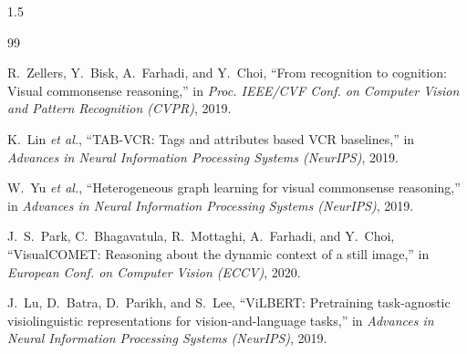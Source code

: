 \documentclass[a4paper, 14pt, oneside]{Thesis}
\begin{document}
{\pagestyle{plain}  %


\tableofcontents %


\listoftables

\listoffigures  %


\mainmatter	  %
\pagestyle{myheadings}  %

\begin{spacing}{1.5}

\begin{thebibliography}{99}

R.~Zellers, Y.~Bisk, A.~Farhadi, and Y.~Choi, ``From recognition to cognition: Visual commonsense reasoning,'' in \textit{Proc. IEEE/CVF Conf. on Computer Vision and Pattern Recognition (CVPR)}, 2019.

K.~Lin \textit{et al.}, ``TAB-VCR: Tags and attributes based VCR baselines,'' in \textit{Advances in Neural Information Processing Systems (NeurIPS)}, 2019.

W.~Yu \textit{et al.}, ``Heterogeneous graph learning for visual commonsense reasoning,'' in \textit{Advances in Neural Information Processing Systems (NeurIPS)}, 2019.

J.~S.~Park, C.~Bhagavatula, R.~Mottaghi, A.~Farhadi, and Y.~Choi, ``VisualCOMET: Reasoning about the dynamic context of a still image,'' in \textit{European Conf. on Computer Vision (ECCV)}, 2020.

J.~Lu, D.~Batra, D.~Parikh, and S.~Lee, ``ViLBERT: Pretraining task-agnostic visiolinguistic representations for vision-and-language tasks,'' in \textit{Advances in Neural Information Processing Systems (NeurIPS)}, 2019.


\end{thebibliography}
\end{spacing}}
\end{document}
